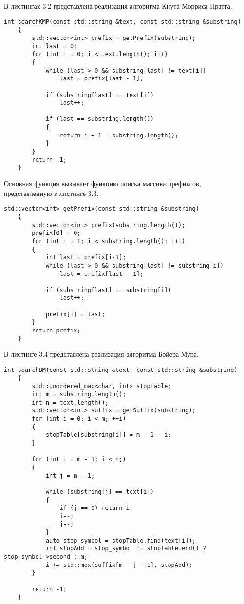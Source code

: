\documentclass[a4paper,12pt]{report}
\begin{document}
В листингах 3.2 представлена реализация алгоритма Кнута-Морриса-Пратта.
\begin{lstlisting}[caption=Главная функция алгоритма Кнута-Морриса-Пратта]
    int searchKMP(const std::string &text, const std::string &substring)
    {
        std::vector<int> prefix = getPrefix(substring);
        int last = 0;
        for (int i = 0; i < text.length(); i++)
        {
            while (last > 0 && substring[last] != text[i])
                last = prefix[last - 1];
    
            if (substring[last] == text[i])
                last++;
    
            if (last == substring.length())
            {
                return i + 1 - substring.length();
            }
        }
        return -1;
    }
\end{lstlisting}

 Основная функция вызывает функцию поиска массива префиксов, представленную в листинге 3.3.

\begin{lstlisting}[caption=Функция вычисления массива префиксов]
    std::vector<int> getPrefix(const std::string &substring)
    {
        std::vector<int> prefix(substring.length());
        prefix[0] = 0;
        for (int i = 1; i < substring.length(); i++)
        {
            int last = prefix[i-1];
            while (last > 0 && substring[last] != substring[i])
                last = prefix[last - 1];
    
            if (substring[last] == substring[i])
                last++;
    
            prefix[i] = last;
        }
        return prefix;
    }
\end{lstlisting}

В листинге 3.4 представлена реализация алгоритма Бойера-Мура.

\begin{lstlisting}[caption=Главная функция алгоритма Бойера-Мура]
    int searchBM(const std::string &text, const std::string &substring)
    {
        std::unordered_map<char, int> stopTable;
        int m = substring.length();
        int n = text.length();
        std::vector<int> suffix = getSuffix(substring);
        for (int i = 0; i < m; ++i)
        {
            stopTable[substring[i]] = m - 1 - i;
        }
    
        for (int i = m - 1; i < n;)
        {
            int j = m - 1;
    
            while (substring[j] == text[i])
            {
                if (j == 0) return i;
                i--;
                j--;
            }
            auto stop_symbol = stopTable.find(text[i]);
            int stopAdd = stop_symbol != stopTable.end() ? stop_symbol->second : m;
            i += std::max(suffix[m - j - 1], stopAdd);
        }
    
        return -1;
    }
\end{lstlisting}
\end{document}
